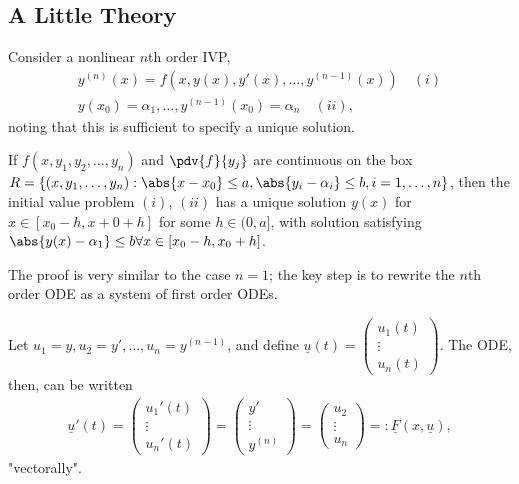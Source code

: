 \subsection{A Little Theory}

Consider a nonlinear $n$th order IVP, \begin{align*}
    y^{(n)}(x) = f(x, y(x), y'(x), \dots, y^{(n-1)}(x))\quad (i)\\
    y(x_0) = \alpha_1, \dots, y^{(n-1)}(x_0) = \alpha_n \quad (ii),
\end{align*}
noting that this is sufficient to specify a unique solution.
\begin{theorem}
    If $f(x, y_1, y_2, \dots, y_n)$ and $\pdv{f}{y_j}$ are continuous on the box $R = \{(x, y_1, \dots, y_n) : \abs{x - x_0} \leq a, \abs{y_i - \alpha_i} \leq b, i = 1, \dots, n\}$, then the initial value problem $(i)$, $(ii)$ has a unique solution $y(x)$ for $x \in [x_0 - h, x+0 + h]$ for some $h \in (0, a]$, with solution satisfying $\abs{y(x)-\alpha_1} \leq b \forall x \in [x_0 - h, x_0 +h]$.
\end{theorem}
\begin{remark}
    The proof is very similar to the case $n = 1$; the key step is to rewrite the $n$th order ODE as a system of first order ODEs.

    Let $u_1 = y, u_2 = y', \dots, u_n = y^{(n-1)}$, and define $\underline{u}(t) = \begin{pmatrix}
        u_1(t)\\
        \vdots \\
        u_n(t)
    \end{pmatrix}$. The ODE, then, can be written \begin{align*}
        \underline{u}'(t) = \begin{pmatrix}
            u_1'(t)\\
            \vdots\\
            u_n'(t)
        \end{pmatrix} = \begin{pmatrix}
            y'\\
            \vdots \\
            y^{(n)}
        \end{pmatrix}
            = \begin{pmatrix}
            u_2\\
            \vdots\\
            u_n
        \end{pmatrix} =: \underline{F}(x, \underline{u}),
    \end{align*}
    "vectorally".
\end{remark}


